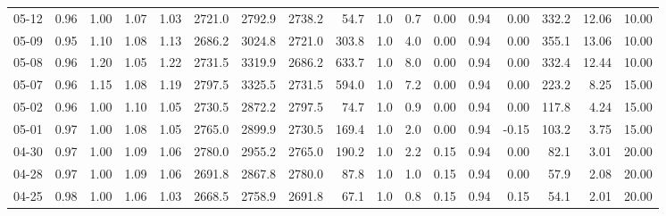 \begin{threeparttable}
{\begin{tabular}{lrrrrrrrrrrrrrrrr}
  05-12 &         0.96 &           1.00 &          1.07 &          1.03 & 2721.0 & 2792.9 & 2738.2 &       54.7 &                      1.0 &                 0.7 &       0.00 &      0.94 &           0.00 &            332.2 &           12.06 &                  10.00 \\
  05-09 &         0.95 &           1.10 &          1.08 &          1.13 & 2686.2 & 3024.8 & 2721.0 &      303.8 &                      1.0 &                 4.0 &       0.00 &      0.94 &           0.00 &            355.1 &           13.06 &                  10.00 \\
  05-08 &         0.96 &           1.20 &          1.05 &          1.22 & 2731.5 & 3319.9 & 2686.2 &      633.7 &                      1.0 &                 8.0 &       0.00 &      0.94 &           0.00 &            332.4 &           12.44 &                  10.00 \\
  05-07 &         0.96 &           1.15 &          1.08 &          1.19 & 2797.5 & 3325.5 & 2731.5 &      594.0 &                      1.0 &                 7.2 &       0.00 &      0.94 &           0.00 &            223.2 &            8.25 &                  15.00 \\
  05-02 &         0.96 &           1.00 &          1.10 &          1.05 & 2730.5 & 2872.2 & 2797.5 &       74.7 &                      1.0 &                 0.9 &       0.00 &      0.94 &           0.00 &            117.8 &            4.24 &                  15.00 \\
  05-01 &         0.97 &           1.00 &          1.08 &          1.05 & 2765.0 & 2899.9 & 2730.5 &      169.4 &                      1.0 &                 2.0 &       0.00 &      0.94 &          -0.15 &            103.2 &            3.75 &                  15.00 \\
  04-30 &         0.97 &           1.00 &          1.09 &          1.06 & 2780.0 & 2955.2 & 2765.0 &      190.2 &                      1.0 &                 2.2 &       0.15 &      0.94 &           0.00 &             82.1 &            3.01 &                  20.00 \\
  04-28 &         0.97 &           1.00 &          1.09 &          1.06 & 2691.8 & 2867.8 & 2780.0 &       87.8 &                      1.0 &                 1.0 &       0.15 &      0.94 &           0.00 &             57.9 &            2.08 &                  20.00 \\
  04-25 &         0.98 &           1.00 &          1.06 &          1.03 & 2668.5 & 2758.9 & 2691.8 &       67.1 &                      1.0 &                 0.8 &       0.15 &      0.94 &           0.15 &             54.1 &            2.01 &                  20.00 \\

\end{tabular}}
\end{threeparttable}

